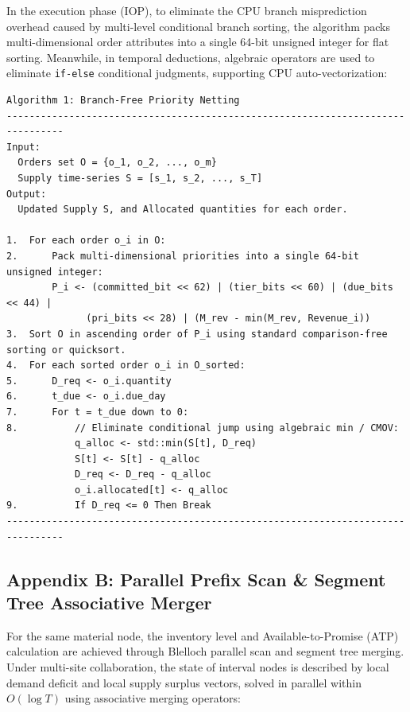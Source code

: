 \documentclass[11pt,a4paper]{article}
\begin{document}
In the execution phase (IOP), to eliminate the CPU branch misprediction overhead caused by multi-level conditional branch sorting, the algorithm packs multi-dimensional order attributes into a single 64-bit unsigned integer for flat sorting. Meanwhile, in temporal deductions, algebraic operators are used to eliminate \texttt{if-else} conditional judgments, supporting CPU auto-vectorization:

\begin{verbatim}
Algorithm 1: Branch-Free Priority Netting
--------------------------------------------------------------------------------
Input: 
  Orders set O = {o_1, o_2, ..., o_m}
  Supply time-series S = [s_1, s_2, ..., s_T]
Output: 
  Updated Supply S, and Allocated quantities for each order.

1.  For each order o_i in O:
2.      Pack multi-dimensional priorities into a single 64-bit unsigned integer:
        P_i <- (committed_bit << 62) | (tier_bits << 60) | (due_bits << 44) | 
              (pri_bits << 28) | (M_rev - min(M_rev, Revenue_i))
3.  Sort O in ascending order of P_i using standard comparison-free sorting or quicksort.
4.  For each sorted order o_i in O_sorted:
5.      D_req <- o_i.quantity
6.      t_due <- o_i.due_day
7.      For t = t_due down to 0:
8.          // Eliminate conditional jump using algebraic min / CMOV:
            q_alloc <- std::min(S[t], D_req)
            S[t] <- S[t] - q_alloc
            D_req <- D_req - q_alloc
            o_i.allocated[t] <- q_alloc
9.          If D_req <= 0 Then Break
--------------------------------------------------------------------------------
\end{verbatim}

\subsection*{Appendix B: Parallel Prefix Scan \& Segment Tree Associative Merger}

For the same material node, the inventory level and Available-to-Promise (ATP) calculation are achieved through Blelloch parallel scan and segment tree merging. Under multi-site collaboration, the state of interval nodes is described by local demand deficit and local supply surplus vectors, solved in parallel within $O(\log T)$ using associative merging operators:
\end{document}
